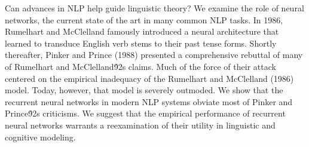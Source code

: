 Can advances in NLP help guide linguistic theory? We examine the role of neural networks, the current state of the art in many common NLP tasks. In 1986, Rumelhart and McClelland famously introduced a neural architecture that learned to transduce English verb stems to their past tense forms. Shortly thereafter, Pinker and Prince (1988) presented a comprehensive rebuttal of many of Rumelhart and McClelland\'92s claims. Much of the force of their attack centered on the empirical inadequacy of the Rumelhart and McClelland (1986) model. Today, however, that model is severely outmoded. We show that the recurrent neural networks in modern NLP systems obviate most of Pinker and Prince\'92s criticisms. We suggest that the empirical performance of recurrent neural networks warrants a reexamination of their utility in linguistic and cognitive modeling.
